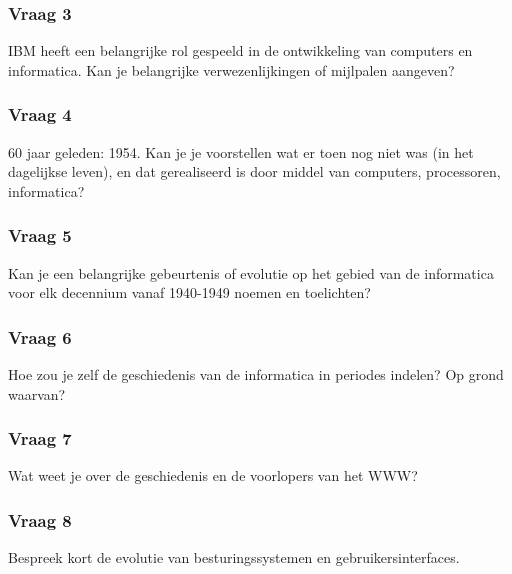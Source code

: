 \documentclass[../main.tex]{subfiles}
\begin{document}
\subsubsection{Vraag 3}
\begin{question}
IBM heeft een belangrijke rol gespeeld in de ontwikkeling van computers en informatica. Kan je belangrijke verwezenlijkingen of mijlpalen aangeven?
\end{question}

\subsubsection{Vraag 4}
\begin{question}
60 jaar geleden: 1954. Kan je je voorstellen wat er toen nog niet was (in het dagelijkse leven), en dat gerealiseerd is door middel van computers, processoren, informatica?
\end{question}

\subsubsection{Vraag 5}
\begin{question}
Kan je een belangrijke gebeurtenis of evolutie op het gebied van de informatica voor elk  decennium vanaf 1940-1949 noemen en toelichten?
\end{question}

\subsubsection{Vraag 6}
\begin{question}
Hoe zou je zelf de geschiedenis van de informatica in periodes indelen? Op grond waarvan?
\end{question}

\subsubsection{Vraag 7}
\begin{question}
Wat weet je over de geschiedenis en de voorlopers van het WWW?
\end{question}

\subsubsection{Vraag 8}
\begin{question}
Bespreek kort de evolutie van besturingssystemen en gebruikersinterfaces.
\end{question}
\end{document}
